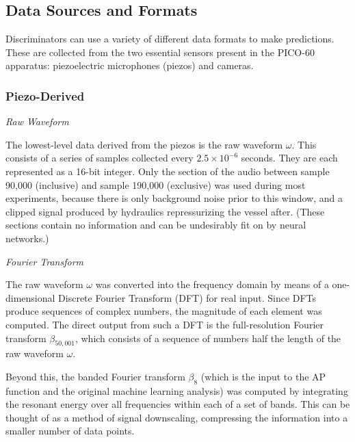 \documentclass[10pt]{article}
\begin{document}
\subsection{Data Sources and Formats} \label{data_formats}

Discriminators can use a variety of different data formats to make predictions. These are collected from the two essential sensors present in the PICO-60 apparatus: piezoelectric microphones (piezos) and cameras.

\subsubsection{Piezo-Derived}

\textit{Raw Waveform}

The lowest-level data derived from the piezos is the raw waveform $\omega$. This consists of a series of samples collected every $2.5 \times 10^{-6}$ seconds. They are each represented as a 16-bit integer. Only the section of the audio between sample 90,000 (inclusive) and sample 190,000 (exclusive) was used during most experiments, because there is only background noise prior to this window, and a clipped signal produced by hydraulics repressurizing the vessel after. (These sections contain no information and can be undesirably fit on by neural networks.)

\textit{Fourier Transform}

The raw waveform $\omega$ was converted into the frequency domain by means of a one-dimensional Discrete Fourier Transform (DFT) for real input. Since DFTs produce sequences of complex numbers, the magnitude of each element was computed. The direct output from such a DFT is the full-resolution Fourier transform $\beta _{50,001}$, which consists of a sequence of numbers half the length of the raw waveform $\omega$.

Beyond this, the banded Fourier transform $\beta_{8}$ (which is the input to the AP function and the original machine learning analysis) was computed by integrating the resonant energy over all frequencies within each of a set of bands. This can be thought of as a method of signal downscaling, compressing the information into a smaller number of data points.
\end{document}
